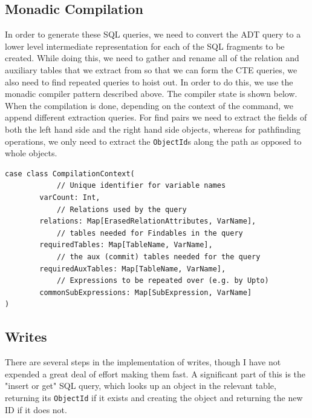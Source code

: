 \documentclass[12pt,a4paper,twoside,openright]{report}
\newcommand\codeName[1]{\texttt{#1}}
\renewcommand{\baselinestretch}{1.1}    %
\begin{document}
\begin{framed}
\end{framed}
	\subsection{Monadic Compilation}
	In order to generate these SQL queries, we need to convert the ADT query to a lower level intermediate representation for each of the SQL fragments to be created. While doing this, we need to gather and rename all of the relation and auxiliary tables that we extract from so that we can form the CTE queries, we also need to find repeated queries to hoist out. In order to do this, we use the monadic compiler pattern described above. The compiler state is shown below. When the compilation is done, depending on the context of the command, we append different extraction queries. For find pairs we need to extract the fields of both the left hand side and the right hand side objects, whereas for pathfinding operations, we only need to extract the \codeName{ObjectId}s along the path as opposed to whole  objects.
	
\renewcommand{\baselinestretch}{0.8}
\begin{framed}
	\begin{verbatim}
case class CompilationContext(
            // Unique identifier for variable names
        varCount: Int,
            // Relations used by the query
        relations: Map[ErasedRelationAttributes, VarName], 
            // tables needed for Findables in the query
        requiredTables: Map[TableName, VarName],
            // the aux (commit) tables needed for the query
        requiredAuxTables: Map[TableName, VarName],
            // Expressions to be repeated over (e.g. by Upto)
        commonSubExpressions: Map[SubExpression, VarName]
)

	\end{verbatim}
\end{framed}
\renewcommand{\baselinestretch}{1.1}

	\subsection{Writes}
	There are several steps in the implementation of writes, though I have not expended  a great deal of effort making them fast. A significant part of this is the "insert or get" SQL query, which looks up an object in the relevant table, returning its \codeName{ObjectId} if it exists and creating the object and returning the new ID if it does not.
	
\end{document}
